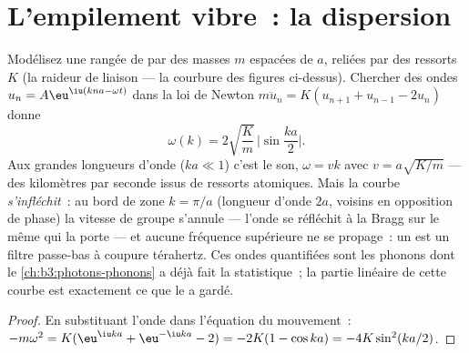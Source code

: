 \section{L'empilement vibre~: la dispersion}

\begin{theorem}\label{thm:b3:crystalline-solids:dispersion}
Modélisez une rangée de  par des masses $m$ espacées de $a$,
reliées par des ressorts $K$ (la raideur de liaison --- la courbure
des figures ci-dessus). Chercher des ondes
$u_n = A\eu^{\iu(kna - \omega t)}$ dans la loi de Newton
$m\ddot u_n = K(u_{n+1} + u_{n-1} - 2u_n)$ donne
\[
\omega(k) = 2\sqrt{\frac{K}{m}}\,\Big|\sin\frac{ka}{2}\Big| .
\]
Aux grandes longueurs d'onde ($ka \ll 1$) c'est le son,
$\omega = vk$ avec $v = a\sqrt{K/m}$ --- des kilomètres par seconde
issus de ressorts atomiques. Mais la courbe \emph{s'infléchit}~: au
bord de zone $k = \pi/a$ (longueur d'onde $2a$, voisins en
opposition de phase) la vitesse de groupe s'annule --- l'onde se
réfléchit à la Bragg sur le  même qui la porte --- et aucune
fréquence supérieure ne se propage~: un  est un filtre
passe-bas à coupure térahertz. Ces ondes quantifiées sont les phonons
dont le \cref{ch:b3:photons-phonons} a déjà fait la statistique~; la
partie linéaire de cette courbe est exactement ce que le  a gardé.
\end{theorem}

\begin{proof}
En substituant l'onde dans l'équation du mouvement~: $-m\omega^2 =
K(\eu^{\iu ka} + \eu^{-\iu ka} - 2) = -2K(1 - \cos ka) =
-4K\sin^2(ka/2)$.
\end{proof}

